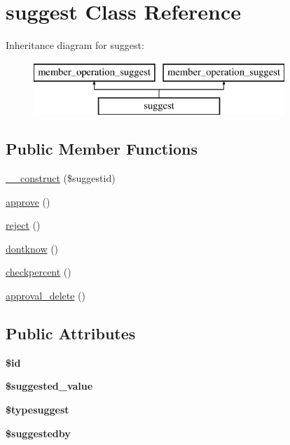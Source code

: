 \hypertarget{classsuggest}{\section{suggest Class Reference}
\label{classsuggest}
}
Inheritance diagram for suggest\-:\begin{figure}[H]
\begin{center}
\leavevmode
\includegraphics[height=2.000000cm]{classsuggest}
\end{center}
\end{figure}
\subsection*{Public Member Functions}
\begin{DoxyCompactItemize}
\item 
\hyperlink{classsuggest_a6e0521c192159953fda4bd293b01d440}{\-\_\-\-\_\-construct} (\$suggestid)
\item 
\hyperlink{classsuggest_a88a3a93bbc97e562d8f4a2b04bc72d14}{approve} ()
\item 
\hyperlink{classsuggest_a7786abfabcc1c14520f6199d1e93bbb2}{reject} ()
\item 
\hyperlink{classsuggest_aea8963c5a27e226cd1bbc039d14c39bd}{dontknow} ()
\item 
\hyperlink{classsuggest_aec18fc5fc3aa1f7ab553f632d822bd91}{checkpercent} ()
\item 
\hyperlink{classsuggest_a32f9238a6ea3e85021319f6cec2f6fca}{approval\-\_\-delete} ()
\end{DoxyCompactItemize}
\subsection*{Public Attributes}
\begin{DoxyCompactItemize}
\item 
\hypertarget{classsuggest_a803056257d5db2637c35becdc6f8ddc8}{{\bfseries \$id}}\label{classsuggest_a803056257d5db2637c35becdc6f8ddc8}

\item 
\hypertarget{classsuggest_afde8633e323581d390c204893b54a2f3}{{\bfseries \$suggested\-\_\-value}}\label{classsuggest_afde8633e323581d390c204893b54a2f3}

\item 
\hypertarget{classsuggest_a8e540fe8897c430a0e0fab8760036b40}{{\bfseries \$typesuggest}}\label{classsuggest_a8e540fe8897c430a0e0fab8760036b40}

\item 
\hypertarget{classsuggest_a013083c80765c478262f28166c8f1491}{{\bfseries \$suggestedby}}\label{classsuggest_a013083c80765c478262f28166c8f1491}

\end{DoxyCompactItemize}
